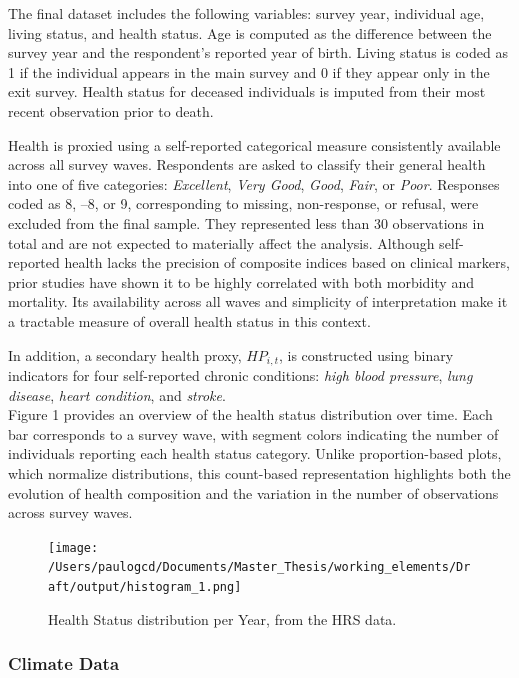 \documentclass{article}
\begin{document}
The final dataset includes the following variables: survey year, individual age, living status, and health status.
Age is computed as the difference between the survey year and the respondent’s reported year of birth.
Living status is coded as 1 if the individual appears in the main survey and 0 if they appear only in the exit survey.
Health status for deceased individuals is imputed from their most recent observation prior to death.

Health is proxied using a self-reported categorical measure consistently
available across all survey waves. Respondents are asked to classify their
general health into one of five categories: \textit{Excellent}, \textit{Very Good},
\textit{Good}, \textit{Fair}, or \textit{Poor}.
Responses coded as 8, –8, or 9, corresponding to missing, non-response, or refusal, 
were excluded from the final sample.
They represented less than 30 observations in total and are not expected to materially affect the analysis.
Although self-reported health lacks the precision of composite indices based on clinical markers,
prior studies have shown it to be highly correlated with both morbidity and mortality.
Its availability across all waves and simplicity of interpretation make
it a tractable measure of overall health status in this context.

In addition, a secondary health proxy, $HP_{i,t}$, is constructed using
binary indicators for four self-reported chronic conditions: \textit{high blood pressure},
\textit{lung disease}, \textit{heart condition}, and \textit{stroke}.
\\ 

Figure 1 provides an overview of the health status distribution over time.
Each bar corresponds to a survey wave, with segment colors indicating the number of individuals reporting each health status category.
Unlike proportion-based plots, which normalize distributions, this count-based representation highlights both the evolution of health composition and the variation in the number of observations across survey waves.


\begin{figure}[H]
    \texttt{[image: /Users/paulogcd/Documents/Master\_Thesis/working\_elements/Draft/output/histogram\_1.png]}
    \caption{Health Status distribution per Year, from the HRS data.}
\end{figure}

\subsubsection{Climate Data}
\end{document}
